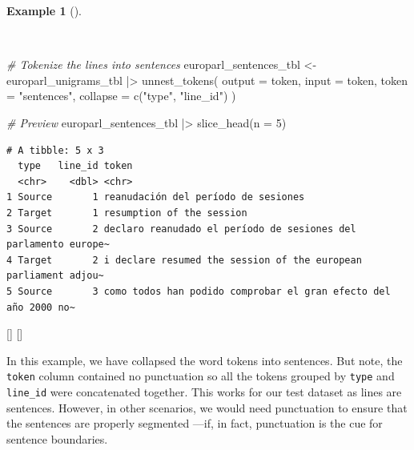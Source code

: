 \documentclass[
  letterpaper,
  krantz1]{latex/krantz-mod}
\newenvironment{Shaded}{\begin{snugshade}}{\end{snugshade}}
\newcommand{\AttributeTok}[1]{\textcolor[rgb]{0.00,0.00,0.00}{#1}}
\newcommand{\CommentTok}[1]{\textcolor[rgb]{0.00,0.00,0.00}{\textit{#1}}}
\newcommand{\DecValTok}[1]{\textcolor[rgb]{0.00,0.00,0.00}{#1}}
\newcommand{\FunctionTok}[1]{\textcolor[rgb]{0.00,0.00,0.00}{#1}}
\newcommand{\NormalTok}[1]{\textcolor[rgb]{0.00,0.00,0.00}{#1}}
\newcommand{\OtherTok}[1]{\textcolor[rgb]{0.00,0.00,0.00}{#1}}
\newcommand{\SpecialCharTok}[1]{\textcolor[rgb]{0.00,0.00,0.00}{#1}}
\newcommand{\StringTok}[1]{\textcolor[rgb]{0.00,0.00,0.00}{#1}}
\newcommand{\cindex}[1]{%
  \StrSubstitute{#1}{_}{\_}[\temp]%
  \index{\temp}%
}
\theoremstyle{definition}
\theoremstyle{definition}
\newtheorem{example}{Example}[chapter]
\theoremstyle{remark}
\begin{document}
\begin{example}[]\protect\hypertarget{exm-transform-europarl-tokenization-sentences}{}\label{exm-transform-europarl-tokenization-sentences}

~

\begin{Shaded}
\begin{Highlighting}[numbers=left,,]
\CommentTok{\# Tokenize the lines into sentences}
\NormalTok{europarl\_sentences\_tbl }\OtherTok{\textless{}{-}}
\NormalTok{  europarl\_unigrams\_tbl }\SpecialCharTok{|\textgreater{}}
  \FunctionTok{unnest\_tokens}\NormalTok{(}
    \AttributeTok{output =}\NormalTok{ token,}
    \AttributeTok{input =}\NormalTok{ token,}
    \AttributeTok{token =} \StringTok{"sentences"}\NormalTok{,}
    \AttributeTok{collapse =} \FunctionTok{c}\NormalTok{(}\StringTok{"type"}\NormalTok{, }\StringTok{"line\_id"}\NormalTok{)}
\NormalTok{  )}

\CommentTok{\# Preview}
\NormalTok{europarl\_sentences\_tbl }\SpecialCharTok{|\textgreater{}}
  \FunctionTok{slice\_head}\NormalTok{(}\AttributeTok{n =} \DecValTok{5}\NormalTok{)}
\end{Highlighting}
\end{Shaded}

\begin{verbatim}
# A tibble: 5 x 3
  type   line_id token                                                          
  <chr>    <dbl> <chr>                                                          
1 Source       1 reanudación del período de sesiones                            
2 Target       1 resumption of the session                                      
3 Source       2 declaro reanudado el período de sesiones del parlamento europe~
4 Target       2 i declare resumed the session of the european parliament adjou~
5 Source       3 como todos han podido comprobar el gran efecto del año 2000 no~
\end{verbatim}

\cindex{unnest_tokens()}\cindex{slice_head()}

\end{example}

In this example, we have collapsed the word tokens into sentences. But
note, the \texttt{token} column contained no punctuation so all the
tokens grouped by \texttt{type} and \texttt{line\_id} were concatenated
together. This works for our test dataset as lines are sentences.
However, in other scenarios, we would need punctuation to ensure that
the sentences are properly segmented ---if, in fact, punctuation is the
cue for sentence boundaries.
\end{document}
